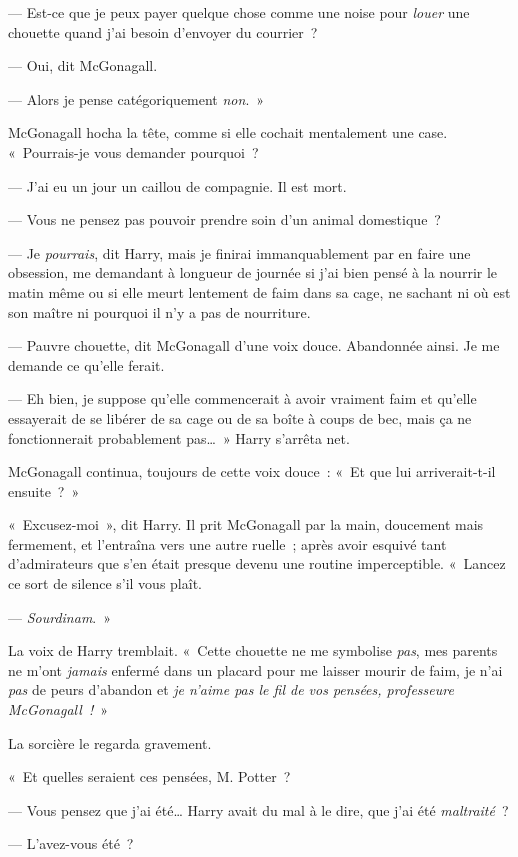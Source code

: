 --- Est-ce que je peux payer quelque chose comme une noise pour \emph{louer} une chouette quand j'ai besoin d'envoyer du courrier~?

--- Oui, dit McGonagall.

--- Alors je pense catégoriquement \emph{non}.~»

McGonagall hocha la tête, comme si elle cochait mentalement une case.
«~Pourrais-je vous demander pourquoi~?

--- J'ai eu un jour un caillou de compagnie. Il est mort.

--- Vous ne pensez pas pouvoir prendre soin d'un animal domestique~?

--- Je \emph{pourrais}, dit Harry, mais je finirai immanquablement par en faire une obsession, me demandant à longueur de journée si j'ai bien pensé à la nourrir le matin même ou si elle meurt lentement de faim dans sa cage, ne sachant ni où est son maître ni pourquoi il n'y a pas de nourriture.

--- Pauvre chouette, dit McGonagall d'une voix douce. Abandonnée ainsi. Je me demande ce qu'elle ferait.

--- Eh bien, je suppose qu'elle commencerait à avoir vraiment faim et qu'elle essayerait de se libérer de sa cage ou de sa boîte à coups de bec, mais ça ne fonctionnerait probablement pas…~» Harry s'arrêta net.

McGonagall continua, toujours de cette voix douce~: «~Et que lui arriverait-t-il ensuite~?~»

«~Excusez-moi~», dit Harry. Il prit McGonagall par la main, doucement mais fermement, et l'entraîna vers une autre ruelle~;
après avoir esquivé tant d'admirateurs que s'en était presque devenu une routine imperceptible.
«~Lancez ce sort de silence s'il vous plaît.

--- \emph{Sourdinam}.~»

La voix de Harry tremblait. «~Cette chouette ne me symbolise \emph{pas}, mes parents ne m'ont \emph{jamais} enfermé dans un placard pour me laisser mourir de faim, je n'ai \emph{pas} de peurs d'abandon et \emph{je n'aime pas le fil de vos pensées, professeure McGonagall~!}~»

La sorcière le regarda gravement.

«~Et quelles seraient ces pensées, M. Potter~?

--- Vous pensez que j'ai été… Harry avait du mal à le dire, que j'ai été \emph{maltraité}~?

--- L'avez-vous été~?

